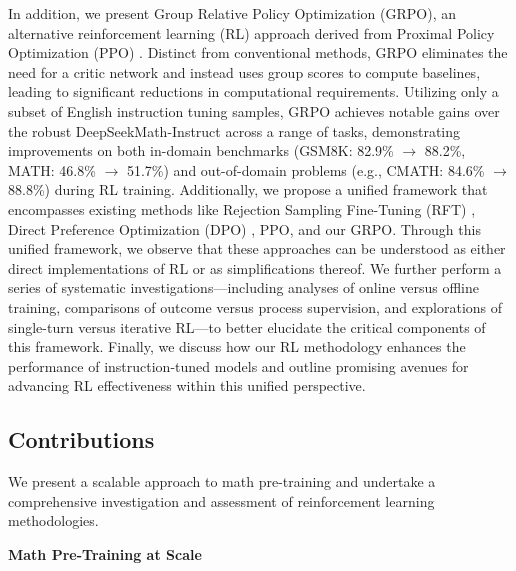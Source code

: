 In addition, we present Group Relative Policy Optimization (GRPO), an alternative reinforcement learning (RL) approach derived from Proximal Policy Optimization (PPO) \citep{schulman2017proximal}. Distinct from conventional methods, GRPO eliminates the need for a critic network and instead uses group scores to compute baselines, leading to significant reductions in computational requirements. Utilizing only a subset of English instruction tuning samples, GRPO achieves notable gains over the robust DeepSeekMath-Instruct across a range of tasks, demonstrating improvements on both in-domain benchmarks (GSM8K: 82.9\% $\rightarrow$ 88.2\%, MATH: 46.8\% $\rightarrow$ 51.7\%) and out-of-domain problems (e.g., CMATH: 84.6\% $\rightarrow$ 88.8\%) during RL training. Additionally, we propose a unified framework that encompasses existing methods like Rejection Sampling Fine-Tuning (RFT) \citep{yuan2023scaling}, Direct Preference Optimization (DPO) \citep{dpo}, PPO, and our GRPO. Through this unified framework, we observe that these approaches can be understood as either direct implementations of RL or as simplifications thereof. We further perform a series of systematic investigations—including analyses of online versus offline training, comparisons of outcome versus process supervision, and explorations of single-turn versus iterative RL—to better elucidate the critical components of this framework. Finally, we discuss how our RL methodology enhances the performance of instruction-tuned models and outline promising avenues for advancing RL effectiveness within this unified perspective.

\subsection{Contributions}
We present a scalable approach to math pre-training and undertake a comprehensive investigation and assessment of reinforcement learning methodologies.

\textbf{Math Pre-Training at Scale}


